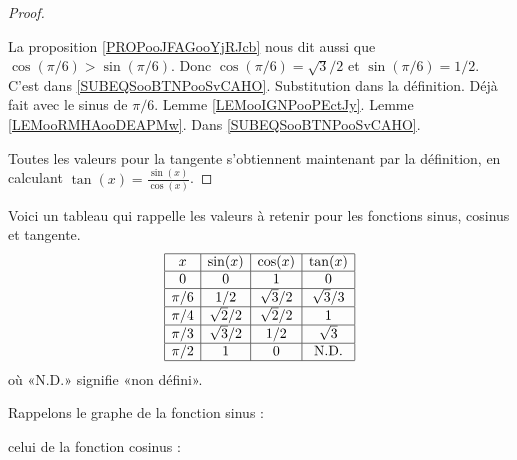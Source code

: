 \begin{proof}
\begin{subproof}
		La proposition \ref{PROPooJFAGooYjRJcb} nous dit aussi que \( \cos(\pi/6)>\sin(\pi/6)\). Donc \( \cos(\pi/6)=\sqrt{ 3 }/2\) et \( \sin(\pi/6)=1/2\).
		\spitem[\( \sin(\pi/2)=1 \)] C'est dans \eqref{SUBEQSooBTNPooSvCAHO}.
		\spitem[\( \cos(0)=1 \)] Substitution dans la définition.
		\spitem[\( \cos(\pi/6)=\sqrt{ 3 }/2 \)] Déjà fait avec le sinus de \( \pi/6\).
		\spitem[\( \cos(\pi/4)=\sqrt{ 2 }/2 \)]  Lemme \ref{LEMooIGNPooPEctJy}.
		\spitem[\( \cos(\pi/3)=1/2 \)] Lemme \ref{LEMooRMHAooDEAPMw}.
		\spitem[\( \cos(\pi/2)=0 \)] Dans \eqref{SUBEQSooBTNPooSvCAHO}.
	\end{subproof}
	Toutes les valeurs pour la tangente s'obtiennent maintenant par la définition, en calculant \( \tan(x)=\frac{ \sin(x) }{ \cos(x) }\).
\end{proof}

Voici un tableau qui rappelle les valeurs à retenir pour les fonctions sinus, cosinus et tangente.
\begin{equation}\label{PGooIMQFooTnBdIl}
	\begin{array}[]{|c|c|c|c|}
		\hline
		x     & \sin(x)    & \cos(x)    & \tan(x)     \\
		\hline
		0     & 0          & 1          & 0           \\
		\hline
		\pi/6 & 1/2        & \sqrt{3}/2 & \sqrt{3}/3  \\
		\hline
		\pi/4 & \sqrt{2}/2 & \sqrt{2}/2 & 1           \\
		\hline
		\pi/3 & \sqrt{3}/2 & 1/2        & \sqrt{3}    \\
		\hline
		\pi/2 & 1          & 0          & \text{N.D.} \\
		\hline
	\end{array}
\end{equation}
où «N.D.»  signifie «non défini».

Rappelons le graphe de la fonction sinus :
\begin{center}
	
\end{center}
celui de la fonction cosinus :
\begin{center}
	
\end{center}



